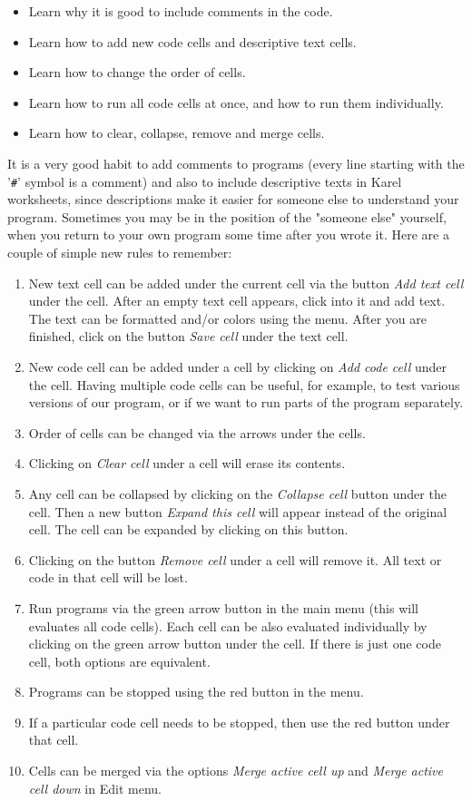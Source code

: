 \documentclass[article,A4,12pt]{llncs}
\begin{document}
\begin{itemize}
\item Learn why it is good to include comments in the code.
\item Learn how to add new code cells and descriptive text cells.
\item Learn how to change the order of cells.
\item Learn how to run all code cells at once, and how to run them individually.
\item Learn how to clear, collapse, remove and merge cells.
\end{itemize}
It is a very good habit to add comments to programs (every line starting with the '{\tt \#}'
symbol is a comment) and also to include descriptive 
texts in Karel worksheets, since descriptions make it easier for someone else to 
understand your program. Sometimes you may be in the position of the "someone else" yourself,
when you return to your own program some time after you wrote it. Here are a couple of 
simple new rules to remember:
\begin{enumerate} 
\item New text cell can be added under the current cell via the button 
      {\em Add text cell} under the cell. 
      After an empty text cell appears, click into it and add text. The text can be 
      formatted and/or colors using the menu. After you are finished, click 
      on the button {\em Save cell} under the text cell. 
\item New code cell can be added under a cell by clicking on {\em Add code cell} 
      under the cell. Having multiple code cells can be useful, for example, to test various versions 
      of our program, or if we want to run parts of the program separately. 
\item Order of cells can be changed via the arrows under the cells.
\item Clicking on {\em Clear cell} under a cell will erase its contents.
\item Any cell can be collapsed by clicking on the {\em Collapse cell} button
      under the cell. Then a new button {\em Expand this cell} will appear instead
      of the original cell. The cell can be expanded by clicking on this button.
\item Clicking on the button {\em Remove cell} under a cell will remove it. 
      All text or code in that cell will be lost.
\item Run programs via the green arrow button in the main menu (this will evaluates all code
      cells). Each cell can be also evaluated individually by clicking on the green 
      arrow button under the cell. If there is just one code cell, both options 
      are equivalent.
\item Programs can be stopped using the red button in the menu. 
\item If a particular
      code cell needs to be stopped, then use the red button under that cell.
\item Cells can be merged via the options {\em Merge active cell up} and 
      {\em Merge active cell down} in Edit menu.
\end{enumerate}
\end{document}
